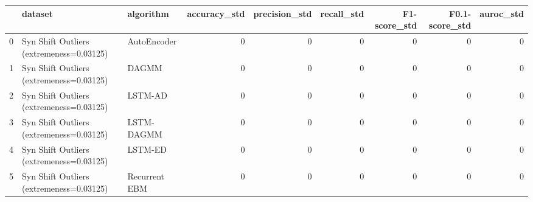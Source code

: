 \begin{tabular}{rllrrrrrr}
\hline
    & dataset                                  & algorithm     &   accuracy\_std &   precision\_std &   recall\_std &   F1-score\_std &   F0.1-score\_std &   auroc\_std \\
\hline
  0 & Syn Shift Outliers (extremeness=0.03125) & AutoEncoder   &              0 &               0 &            0 &              0 &                0 &           0 \\
  1 & Syn Shift Outliers (extremeness=0.03125) & DAGMM         &              0 &               0 &            0 &              0 &                0 &           0 \\
  2 & Syn Shift Outliers (extremeness=0.03125) & LSTM-AD       &              0 &               0 &            0 &              0 &                0 &           0 \\
  3 & Syn Shift Outliers (extremeness=0.03125) & LSTM-DAGMM    &              0 &               0 &            0 &              0 &                0 &           0 \\
  4 & Syn Shift Outliers (extremeness=0.03125) & LSTM-ED       &              0 &               0 &            0 &              0 &                0 &           0 \\
  5 & Syn Shift Outliers (extremeness=0.03125) & Recurrent EBM &              0 &               0 &            0 &              0 &                0 &           0 \\
\hline
\end{tabular}

